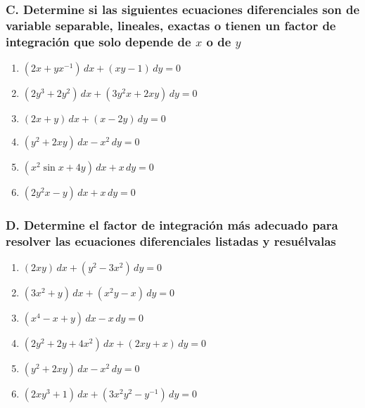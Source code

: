 \documentclass[a4paper,12pt]{article}
\begin{document}
\subsubsection*{C. Determine si las siguientes ecuaciones diferenciales son de variable separable, lineales, exactas o tienen un factor de integración que solo depende de \(x\) o de \(y\)}

\begin{enumerate}
    \item \((2x + yx^{-1}) \, dx + (xy - 1) \, dy = 0\)
    \item \((2y^3 + 2y^2) \, dx + (3y^2x + 2xy) \, dy = 0\)
    \item \((2x + y) \, dx + (x - 2y) \, dy = 0\)
    \item \((y^2 + 2xy) \, dx - x^2 \, dy = 0\)
    \item \((x^2 \sin x + 4y) \, dx + x \, dy = 0\)
    \item \((2y^2x - y) \, dx + x \, dy = 0\)
\end{enumerate}

\subsubsection*{D. Determine el factor de integración más adecuado para resolver las ecuaciones diferenciales listadas y resuélvalas}

\begin{enumerate}
    \item \((2xy) \, dx + (y^2 - 3x^2) \, dy = 0\)
    \item \((3x^2 + y) \, dx + (x^2y - x) \, dy = 0\)
    \item \((x^4 - x + y) \, dx - x \, dy = 0\)
    \item \((2y^2 + 2y + 4x^2) \, dx + (2xy + x) \, dy = 0\)
    \item \((y^2 + 2xy) \, dx - x^2 \, dy = 0\)
    \item \((2xy^3 + 1) \, dx + (3x^2y^2 - y^{-1}) \, dy = 0\)
\end{enumerate}
\end{document}
